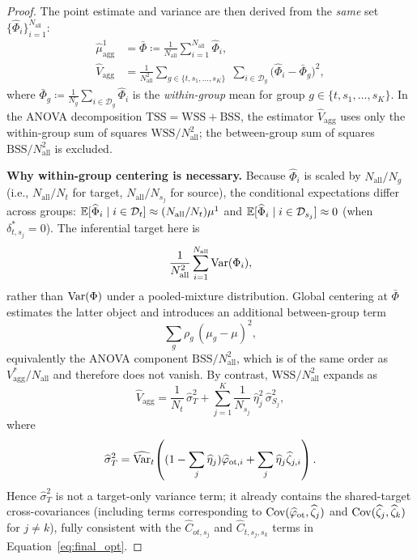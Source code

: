 \documentclass{article}
\begin{document}
\begin{proof}
The point estimate and variance are then derived from the \emph{same} set $\{\widehat{\Phi}_i\}_{i=1}^{N_{\mathrm{all}}}$:
\begin{align*}
\widehat{\mu}^1_{\mathrm{agg}} &= \bar{\Phi} \coloneqq \frac{1}{N_{\mathrm{all}}}\sum_{i=1}^{N_{\mathrm{all}}} \widehat{\Phi}_i, \\[4pt]
\widehat{V}_{\mathrm{agg}} &= \frac{1}{N_{\mathrm{all}}^2}\sum_{g\in\{t,s_1,\ldots,s_K\}}\;\sum_{i\in\mathcal{D}_g} \bigl(\widehat{\Phi}_i - \bar{\Phi}_g\bigr)^2,
\end{align*}
where $\bar{\Phi}_g \coloneqq \frac{1}{N_g}\sum_{i\in\mathcal{D}_g}\widehat{\Phi}_i$ is the \emph{within-group} mean for group $g\in\{t,s_1,\ldots,s_K\}$.
In the ANOVA decomposition $\text{TSS}=\text{WSS}+\text{BSS}$, the estimator $\widehat{V}_{\mathrm{agg}}$ uses only the within-group sum of squares $\text{WSS}/N_{\mathrm{all}}^2$; the between-group sum of squares $\text{BSS}/N_{\mathrm{all}}^2$ is excluded.

\textbf{Why within-group centering is necessary.}
Because $\widehat{\Phi}_i$ is scaled by $N_{\mathrm{all}}/N_g$ (i.e., $N_{\mathrm{all}}/N_t$ for target, $N_{\mathrm{all}}/N_{s_j}$ for source), the conditional expectations differ across groups:
$\operatorname{\mathbb{E}}[\widehat{\Phi}_i\mid i\in\mathcal{D}_t]\approx (N_{\mathrm{all}}/N_t)\mu^1$ and
$\operatorname{\mathbb{E}}[\widehat{\Phi}_i\mid i\in\mathcal{D}_{s_j}]\approx 0$ (when $\delta^*_{t,s_j}=0$).
The inferential target here is
\[
\frac{1}{N_{\mathrm{all}}^2}\sum_{i=1}^{N_{\mathrm{all}}}\operatorname{Var}(\Phi_i),
\]
rather than $\operatorname{Var}(\Phi)$ under a pooled-mixture distribution.
Global centering at $\bar{\Phi}$ estimates the latter object and introduces an additional between-group term
\[
\sum_g \rho_g\,(\mu_g-\mu)^2,
\]
equivalently the ANOVA component $\text{BSS}/N_{\mathrm{all}}^2$, which is of the same order as $V^*_{\mathrm{agg}}/N_{\mathrm{all}}$ and therefore does not vanish.
By contrast, $\text{WSS}/N_{\mathrm{all}}^2$ expands as
\[
\widehat{V}_{\mathrm{agg}}
= \frac{1}{N_t}\,\widehat{\sigma}^2_{T}
  + \sum_{j=1}^{K}\frac{1}{N_{s_j}}\,\widehat{\eta}_j^2\,\widehat{\sigma}^2_{S_j},
\]
where
\[
\widehat{\sigma}^2_T
=\widehat{\operatorname{Var}}_t\!\left((1-\sum_j\widehat{\eta}_j)\widehat{\varphi}_{\mathrm{ot},i}+\sum_j\widehat{\eta}_j\widehat{\zeta}_{j,i}\right).
\]
Hence $\widehat{\sigma}^2_T$ is not a target-only variance term; it already contains the shared-target cross-covariances (including terms corresponding to $\operatorname{Cov}(\widehat{\varphi}_{\mathrm{ot}},\widehat{\zeta}_j)$ and $\operatorname{Cov}(\widehat{\zeta}_j,\widehat{\zeta}_k)$ for $j\neq k$), fully consistent with the $\widehat{C}_{ot,s_j}$ and $\widehat{C}_{t,s_j,s_k}$ terms in Equation~\eqref{eq:final_opt}.


\end{proof}
\end{document}
